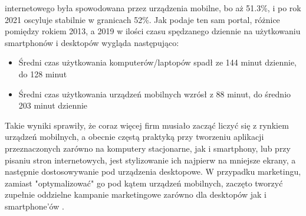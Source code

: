 \documentclass[12pt, a4paper]{article}
\begin{document}
\begin{sloppypar}
{{    internetowego była spowodowana przez urządzenia mobilne, bo aż 51.3\%, i po 
    rok 2021 oscyluje stabilnie w granicach 52\%. Jak podaje ten sam portal,
    różnice pomiędzy rokiem 2013, a 2019 w ilości czasu spędzanego dziennie na 
    użytkowaniu smartphonów i desktopów wygląda następująco:
    \begin{itemize}
      \item Średni czas użytkowania komputerów/laptopów spadł ze 144 minut dziennie, do 128 minut
      \item Średni czas użytkowania urządzeń mobilnych wzrósł z 88 minut, do średnio 203 minut dziennie 
    \end{itemize} 
    Takie wyniki sprawiły, że coraz więcej firm musiało zacząć liczyć się z 
    rynkiem urządzeń mobilnych, a obecnie częstą praktyką przy tworzeniu aplikacji 
    przeznaczonych zarówno na komputery stacjonarne, jak i smartphony, lub przy 
    pisaniu stron internetowych, jest stylizowanie ich najpierw na mniejsze ekrany,
    a następnie dostosowywanie pod urządzenia desktopowe. W przypadku marketingu, 
    zamiast "optymalizować" go pod kątem urządzeń mobilnych, zaczęto tworzyć zupełnie
    oddzielne kampanie marketingowe zarówno dla desktopów jak i smartphone'ów
    \cite{mobile_strategy}.
  }
}
\end{sloppypar}
\end{document}
